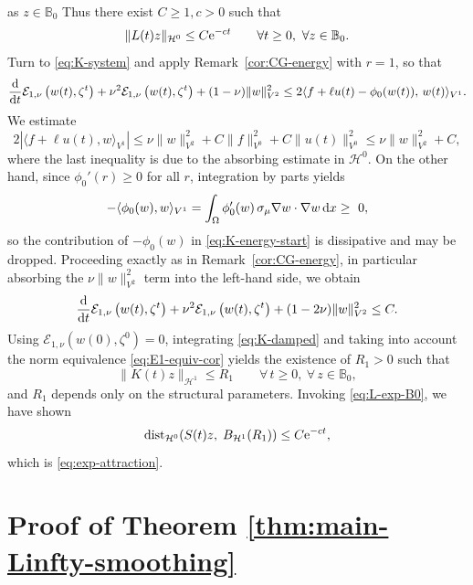 \documentclass[12pt,leqno]{amsart}
\def\e{{\rm e}}
\def\d{{\rm d}}
\def\dist{{\rm dist}}
\theoremstyle{definition}
\numberwithin{equation}{section}
\numberwithin{figure}{section}
\begin{document}
as $z\in\mathbb B_0$
Thus there exist $C\ge 1,c>0$  such that
\begin{equation}\label{eq:L-exp-B0}
\|L(t)z\|_{\mathcal H^0}\le C\e^{-c t}\qquad \forall t\ge 0,\ \forall z\in\mathbb B_0.
\end{equation}
Turn to \eqref{eq:K-system} and
apply Remark~\ref{cor:CG-energy} with $r=1$, so that\begin{equation}\label{eq:K-energy-start}
\frac{\d}{
\d t}\mathcal E_{1,\nu}\left(w(t),\zeta^t\right)+\nu^2\mathcal E_{1,\nu}\left(w(t),\zeta^t\right) + (1-\nu)  \|w\|_{{V^2}}^2 
\le 2 \langle f+\ell u(t)-\phi_0(w(t)),\,w(t)\rangle_{{V^1}} .
\end{equation}
We estimate
\[
2|\langle f+\ell u(t),w\rangle_{{V^1}}|
\le \nu\|w\|_{{V^2}}^2 + C \|f\|_{V^0}^2+ C\|u(t)\|_{V^0}^2 \leq \nu\|w\|_{{V^2}}^2+C,
\]
where the last inequality is due to the absorbing estimate in $\mathcal H^0.$
On the other hand, since $\phi_0'(r)\ge 0$ for all $r$, integration by parts yields
\[
-\langle \phi_0(w),w\rangle_{{V^1}}
=\int_\Omega \phi_0'(w)\,\sigma_\mu\nabla w\cdot\nabla w\,\d x \ge\ 0,
\]
so the contribution of $-\phi_0(w)$ in \eqref{eq:K-energy-start} is dissipative and may be dropped.
Proceeding exactly as in Remark~\ref{cor:CG-energy}, in particular absorbing the $\nu\|w\|_{{V^2}}^2$ term into the left-hand side,
we obtain
\begin{equation}\label{eq:K-damped}
\frac{\d}{\d t}\mathcal E_{1,\nu}\left(w(t),\zeta^t\right)+\nu^2\mathcal E_{1,\nu}\left(w(t),\zeta^t\right) + (1-2\nu)    \|w\|_{{V^2}}^2 
\le C. 
\end{equation}
Using $\mathcal E_{1,\nu}(w(0),\zeta^0)=0$,  integrating \eqref{eq:K-damped} and taking into account the norm equivalence \eqref{eq:E1-equiv-cor} yields
the existence of $R_1>0$ such that
\begin{equation}\label{eq:K-H1-bdd}
\|K(t)z\|_{\mathcal H^1}\le R_1
\qquad \forall\,t\ge 0,\ \forall\,z\in\mathbb B_0,
\end{equation}
and $R_1$ depends only on the structural parameters.
Invoking \eqref{eq:L-exp-B0}, we have shown 
\[
\dist_{\mathcal H^0}\!\left(S(t)z,\;B_{\mathcal H^1}(R_1)\right)\le C\e^{-c t},
\]
which is \eqref{eq:exp-attraction}. 

 
 
 \section{Proof of Theorem \ref{thm:main-Linfty-smoothing}}
 \label{s5}
 
\end{document}
